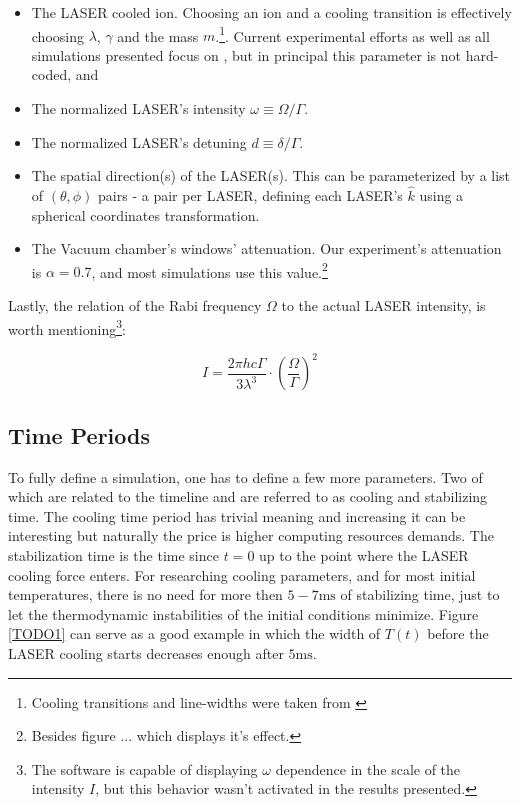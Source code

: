 \begin{itemize}
	\item The LASER cooled ion. Choosing an ion and a cooling transition is effectively choosing $\lambda$, $\gamma$ and the mass $m$.\footnote{Cooling transitions and line-widths were taken from \cite{CoolingBeParameters,CoolingCaParameters1,CoolingCaParameters2,RansfordThesis,RadiumData}}. Current experimental efforts as well as all simulations presented focus on , but in principal this parameter is not hard-coded, and 
	\item The normalized LASER's intensity $\omega \equiv \Omega/\Gamma$.
	\item The normalized LASER's detuning $d \equiv \delta/\Gamma$.
	\item The spatial direction(s) of the LASER(s). This can be parameterized by a list of $(\theta, \phi)$ pairs - a pair per LASER, defining each LASER's $\hat{k}$ using a spherical coordinates transformation.
	\item The Vacuum chamber's windows' attenuation. Our experiment's attenuation is $\alpha = 0.7$, and most simulations use this value.\footnote{Besides figure ... which displays it's effect.}
\end{itemize}

Lastly, the relation of the Rabi frequency $\Omega$ to the actual LASER intensity\cite{CJFootOmega2I}, is worth mentioning\footnote{The software is capable of displaying $\omega$ dependence in the scale of the intensity $I$, but this behavior wasn't activated in the results presented.}:

\begin{equation}
	I = \frac{2\pi h c \Gamma}{3 \lambda^3} \cdot \left(\frac{\Omega}{\Gamma}\right)^2
\end{equation}

\subsection{Time Periods}

To fully define a simulation, one has to define a few more parameters. Two of which are related to the timeline and are referred to as cooling and stabilizing time. The cooling time period has trivial meaning and increasing it can be interesting but naturally the price is higher computing resources demands. The stabilization time is the time since $t=0$ up to the point where the LASER cooling force enters. For researching cooling parameters, and for most initial temperatures, there is no need for more then $5-7\mathrm{ms}$ of stabilizing time, just to let the thermodynamic instabilities of the initial conditions minimize. Figure \ref{TODO1} can serve as a good example in which the width of $T(t)$ before the LASER cooling starts decreases enough after $5 \mathrm{ms}$.

